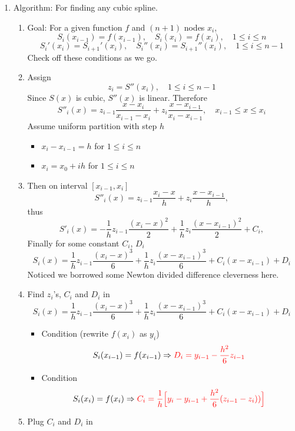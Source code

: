 \documentclass{article}
\theoremstyle{remark}
\begin{document}
\begin{enumerate}
\item Algorithm: For finding any cubic spline.
\begin{enumerate}
\item Goal: For a given function $f$ and $(n+1)$ nodes $x_i$,	
$$
S_i(x_{i-1}) = f(x_{i-1}),\quad S_i(x_{i}) = f(x_{i}),\quad 1\leq i \leq n
$$
$$
S_i'(x_{i}) = S_{i+1}'(x_{i}), \quad S_i''(x_{i}) = S_{i+1}''(x_{i}), \quad 1\leq i \leq n-1
$$
Check off these conditions as we go.
\item Assign 
$$
z_i = S''(x_i),\quad 1\leq i\leq n-1
$$ Since $S(x)$ is cubic, $S''(x)$ is linear. Therefore
$$
S''_i(x) = z_{i-1}\frac{x-x_{i}}{x_{i-1}-x_{i}} + z_{i}\frac{x-x_{i-1}}{x_{i}-x_{i-1}}, \quad x_{i-1}\leq x\leq x_{i}
$$
Assume uniform partition with step $h$
\begin{itemize}
\item $x_{i}-x_{i-1} = h$ for $1\leq i \leq n$
\item $x_i = x_0 + ih$ for $1\leq i \leq n$
\end{itemize}
\item Then on interval $[x_{i-1},x_{i}]$
$$
 S''_i(x) = z_{i-1}\frac{x_{i}-x}{h} + z_{i}\frac{x-x_{i-1}}{h},
$$
thus
$$
 S'_i(x) = -\frac{1}{h}z_{i-1}\frac{(x_{i}-x)^2}{2} +\frac{1}{h} z_{i}\frac{(x-x_{i-1})^2}{2} + C_i,
$$
Finally for some constant $C_i$, $D_i$
$$
 S_i(x) = \frac{1}{h}z_{i-1}\frac{(x_{i}-x)^3}{6} +\frac{1}{h} z_{i}\frac{(x-x_{i-1})^3}{6} + C_i(x-x_{i-1}) + D_i
$$
Noticed we borrowed some Newton divided difference cleverness here.
\item Find $z_i$'s, $C_i$ and $D_i$ in 
$$
 S_i(x) = \frac{1}{h}z_{i-1}
 \frac{(x_{i}-x)^3}{6} +\frac{1}{h} z_{i}\frac{(x-x_{i-1})^3}{6} + C_i(x-x_{i-1}) + D_i
$$
\begin{itemize}
\item Condition (rewrite $f(x_i)$ as $y_i$)
$$
S_i(x_{i-1}) = f(x_{i-1}) \Rightarrow {\color{red} D_i  = y_{i-1} - \frac{h^2}{6}z_{i-1}}
$$
\item Condition
$$
S_i(x_i) = f(x_{i}) \Rightarrow  {\color{red} C_i = \frac{1}{h}\Big[y_i-y_{i-1}+\frac{h^2}{6}(z_{i-1}-z_{i}))\Big]}
$$
\end{itemize}
\item Plug $C_i$ and $D_i$ in 
\begin{equation}\nonumber
\begin{split}

\end{split}
\end{equation}
\end{enumerate}
\end{enumerate}
\end{document}
